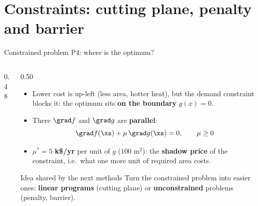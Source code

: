 
\section{Constraints: cutting plane, penalty and barrier}

\begin{frame}{Constrained problem P4: where is the optimum?}
  \begin{columns}[T]
    \begin{column}{0.48\textwidth}
    \end{column}
    \begin{column}{0.50\textwidth}
      \small
      \begin{itemize}
        \item Lower cost is up-left (less area, hotter heat), but the demand constraint blocks it: the optimum sits \textbf{on the boundary} $g(x)=0$.
        \item There $\grad f$ and $\grad g$ are \textbf{parallel}:
        \[ \grad f(\xs)+\mu\,\grad g(\xs)=0,\qquad \mu\ge0 \]
        \item $\mu^\ast=5$ \textbf{k\$/yr} per unit of $g$ ($100$ m$^2$): the \textbf{shadow price} of the constraint, i.e.\ what one more unit of required area costs.
      \end{itemize}
      \begin{alertblock}{Idea shared by the next methods}
        Turn the constrained problem into easier ones: \textbf{linear programs} (cutting plane) or \textbf{unconstrained} problems (penalty, barrier).
      \end{alertblock}
    \end{column}
  \end{columns}
\end{frame}

